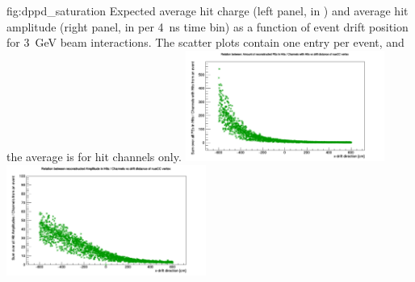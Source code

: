 \begin{dunefigure}{fig:dppd_saturation}
{Expected average hit charge (left panel, in ) and average hit amplitude (right panel, in  per \SI{4}{\nano\s} time bin) as a function of event drift position for \SI{3}{\GeV} beam \nue {} interactions. The scatter plots  contain one entry per event, and the average is for hit  channels only.}
\includegraphics[trim={0cm 0cm 0cm 1.cm}, clip, width=0.49\textwidth]{graphics/dppd_avg_charge_per_channel.pdf} \hfill
\includegraphics[trim={0cm 0cm 0cm 1.cm}, clip, width=0.49\textwidth]{graphics/dppd_avg_amplitude_per_channel.pdf}
\end{dunefigure}

